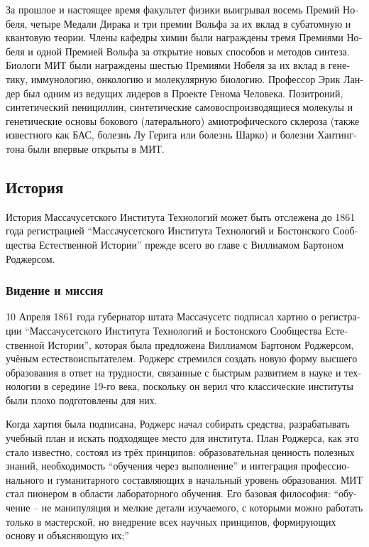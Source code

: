 \begin{russian}
За прошлое и настоящее время факультет физики выигрывал восемь Премий Нобеля, четыре Медали Дирака и три премии Вольфа за их вклад в субатомную и квантовую теории. Члены кафедры химии были награждены тремя Премиями Нобеля и одной Премией Вольфа за открытие новых способов и методов синтеза. Биологи МИТ были награждены шестью Премиями Нобеля за их вклад в генетику, иммунологию, онкологию и молекулярную биологию. Профессор Эрик Ландер был одним из ведущих лидеров в Проекте Генома Человека. Позитроний, синтетический пенициллин, синтетические самовоспроизводящиеся молекулы и генетические основы бокового (латерального) амиотрофического склероза (также известного как БАС, болезнь Лу Герига или болезнь Шарко) и болезни Хантингтона были впервые открыты в МИТ. 
\subsection{История}
История Массачусетского Института Технологий может быть отслежена до 1861 года регистрацией ``Массачусетского Института Технологий и Бостонского Сообщества Естественной Истории'' прежде всего во главе с Виллиамом Бартоном Роджерсом.

\subsubsection{Видение и миссия}

10 Апреля 1861 года губернатор штата Массачусетс подписал хартию о регистрации ``Массачусетского Института Технологий и Бостонского Сообщества Естественной Истории'', которая была предложена Виллиамом Бартоном Роджерсом, учёным естествоиспытателем. Роджерс стремился создать новую форму высшего образования в ответ на трудности, связанные с быстрым развитием в науке и технологии в середине 19-го века, поскольку он верил что классические институты были плохо подготовлены для них.

Когда хартия была подписана, Роджерс начал собирать средства, разрабатывать учебный план и искать подходящее место для института. План Роджерса, как это стало известно, состоял из трёх принципов: образовательная ценность полезных знаний, необходимость ``обучения через выполнение'' и интеграция профессионального и гуманитарного составляющих в начальный уровень образования. МИТ стал пионером в области лабораторного обучения. Его базовая философия: ``обучение -- не манипуляция и мелкие детали изучаемого, с которыми можно работать только в мастерской, но внедрение всех научных принципов, формирующих основу и объясняющую их;''


\end{russian}
